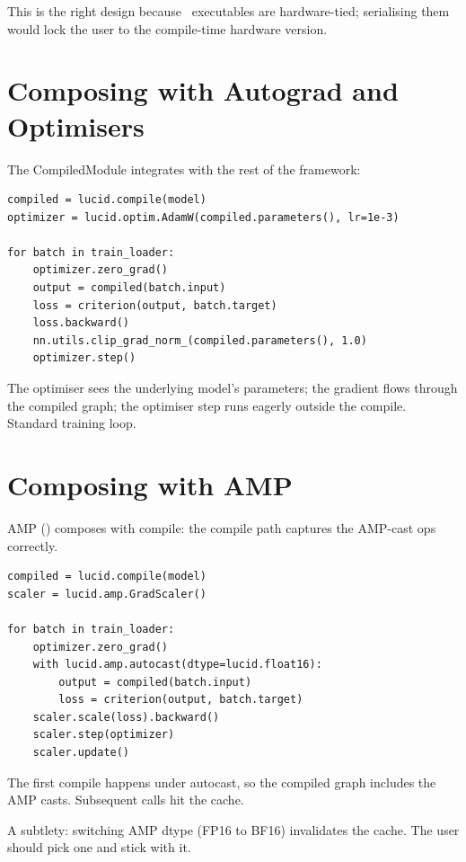 This is the right design because \MPSGraph\ executables are
hardware-tied; serialising them would lock the user to the
compile-time hardware version.

\section{Composing with Autograd and Optimisers}
\label{sec:compiled_module:composing}

The CompiledModule integrates with the rest of the framework:

\begin{lstlisting}[style=lucid,language=LucidPython]
compiled = lucid.compile(model)
optimizer = lucid.optim.AdamW(compiled.parameters(), lr=1e-3)

for batch in train_loader:
    optimizer.zero_grad()
    output = compiled(batch.input)
    loss = criterion(output, batch.target)
    loss.backward()
    nn.utils.clip_grad_norm_(compiled.parameters(), 1.0)
    optimizer.step()
\end{lstlisting}

The optimiser sees the underlying model's parameters; the
gradient flows through the compiled graph; the optimiser step
runs eagerly outside the compile. Standard training loop.

\section{Composing with AMP}
\label{sec:compiled_module:composing_amp}

AMP () composes with compile: the compile path
captures the AMP-cast ops correctly.

\begin{lstlisting}[style=lucid,language=LucidPython]
compiled = lucid.compile(model)
scaler = lucid.amp.GradScaler()

for batch in train_loader:
    optimizer.zero_grad()
    with lucid.amp.autocast(dtype=lucid.float16):
        output = compiled(batch.input)
        loss = criterion(output, batch.target)
    scaler.scale(loss).backward()
    scaler.step(optimizer)
    scaler.update()
\end{lstlisting}

The first compile happens under autocast, so the compiled graph
includes the AMP casts. Subsequent calls hit the cache.

A subtlety: switching AMP dtype (FP16 to BF16) invalidates the
cache. The user should pick one and stick with it.

